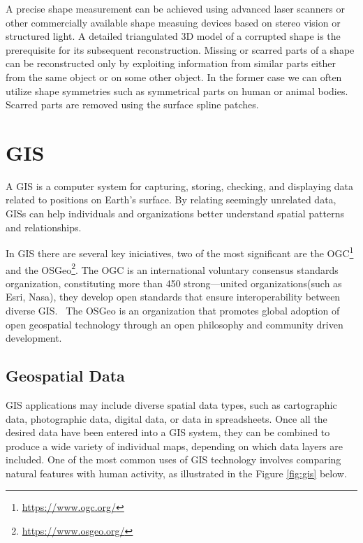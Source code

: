 A precise shape measurement can be achieved using advanced laser scanners or other commercially available shape measuing devices based on stereo 
vision or structured light. A detailed triangulated \gls{3D} model of a corrupted shape is the prerequisite for its subsequent reconstruction. 
Missing or scarred parts of a shape can be reconstructed only by exploiting information from similar parts either from the same
object or on some other object. In the former case we can often utilize shape symmetries such as symmetrical parts on
human or animal bodies. Scarred parts are removed using the surface spline patches.~\cite{7801178}



\section{\gls{GIS}}
\label{sec:geographic_information_system}

A \gls{GIS} is a computer system for capturing, storing, checking, and displaying data related to positions on Earth’s 
surface. By relating seemingly unrelated data, GISs can help individuals and organizations better understand spatial patterns and relationships.
~\cite{natgeo_2024}

In \gls{GIS} there are several key iniciatives, two of the most significant are the \gls{OGC}\footnote{\url{https://www.ogc.org/}} and the \gls{OSGeo}\footnote{\url{https://www.osgeo.org/}}.  
The \gls{OGC} is an international voluntary consensus standards organization, constituting more than 450 strong—united organizations(such as Esri, Nasa), they develop open standards that ensure interoperability between diverse \gls{GIS}.~\cite{ogc_who_we_are, ogcapi}
The \gls{OSGeo} is an organization that promotes global adoption of open geospatial technology through an open philosophy and community driven development.~\cite{osgeo_about}

\subsection{Geospatial Data} 
\label{sub:geospatial_data}

\gls{GIS} applications may include diverse spatial data types, such as cartographic data, photographic data, digital data, or data in spreadsheets. Once all the desired data have been entered into a \gls{GIS} system, 
they can be combined to produce a wide variety of individual maps, depending on which data layers are included. 
One of the most common uses of \gls{GIS} technology involves comparing natural features with human activity, as illustrated in the Figure \ref{fig:gis} below. 


